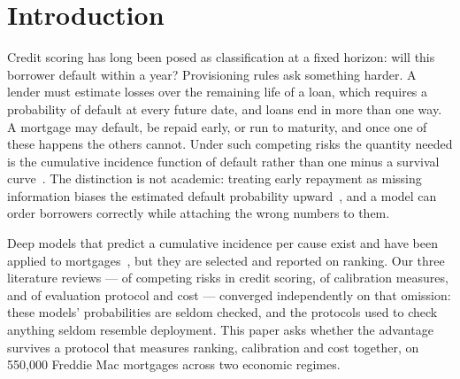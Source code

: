 \documentclass[11pt,journal]{IEEEtran}
\begin{document}
\section{Introduction}
%
Credit scoring has long been posed as classification at a fixed horizon: will
this borrower default within a year? Provisioning rules ask something harder. A
lender must estimate losses over the remaining life of a loan, which requires a
probability of default at every future date, and loans end in more than one way.
A mortgage may default, be repaid early, or run to maturity, and once one of
these happens the others cannot. Under such competing risks the quantity needed
is the cumulative incidence function of default rather than one minus a survival
curve~\cite{finegray1999subdistribution}. The distinction is not academic:
treating early repayment as missing information biases the estimated default
probability upward~\cite{DBLP:journals/jors/FrydmanM22}, and a model can order
borrowers correctly while attaching the wrong numbers to them.

Deep models that predict a cumulative incidence per cause exist and have been
applied to mortgages~\cite{DBLP:conf/aaai/LeeZYS18,
DBLP:journals/jors/BlumenstockLS22}, but they are selected and reported on
ranking. Our three literature reviews --- of competing risks in credit scoring,
of calibration measures, and of evaluation protocol and cost --- converged
independently on that omission: these models' probabilities are seldom checked,
and the protocols used to check anything seldom resemble deployment. This paper asks whether the
advantage survives a protocol that measures ranking, calibration and cost
together, on 550{,}000 Freddie Mac mortgages across two economic regimes.

\end{document}

